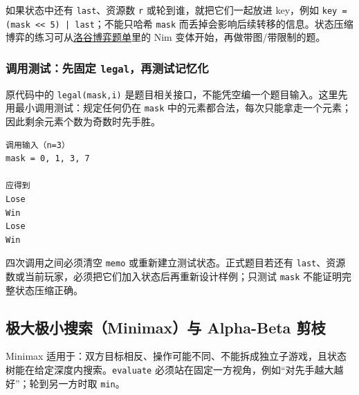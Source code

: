 如果状态中还有 \passthrough{\lstinline!last!}、资源数 \passthrough{\lstinline!r!} 或轮到谁，就把它们一起放进 key，例如 \passthrough{\lstinline!key = (mask << 5) | last!}；不能只哈希 \passthrough{\lstinline!mask!} 而丢掉会影响后续转移的信息。状态压缩博弈的练习可从\href{https://www.luogu.com.cn/training/11251}{洛谷博弈题单}里的 Nim 变体开始，再做带图/带限制的题。

\subsubsection{\texorpdfstring{调用测试：先固定 \texttt{legal}，再测试记忆化}{调用测试：先固定 legal，再测试记忆化}}

原代码中的 \passthrough{\lstinline!legal(mask,i)!} 是题目相关接口，不能凭空编一个题目输入。这里先用最小调用测试：规定任何仍在 \passthrough{\lstinline!mask!} 中的元素都合法，每次只能拿走一个元素；因此剩余元素个数为奇数时先手胜。

\begin{lstlisting}
调用输入（n=3）
mask = 0, 1, 3, 7

应得到
Lose
Win
Lose
Win
\end{lstlisting}

四次调用之间必须清空 \passthrough{\lstinline!memo!} 或重新建立测试状态。正式题目若还有 \passthrough{\lstinline!last!}、资源数或当前玩家，必须把它们加入状态后再重新设计样例；只测试 \passthrough{\lstinline!mask!} 不能证明完整状态压缩正确。


\subsection{极大极小搜索（Minimax）与 Alpha-Beta 剪枝}

Minimax 适用于：双方目标相反、操作可能不同、不能拆成独立子游戏，且状态树能在给定深度内搜索。\passthrough{\lstinline!evaluate!} 必须站在固定一方视角，例如``对先手越大越好''；轮到另一方时取 \passthrough{\lstinline!min!}。

